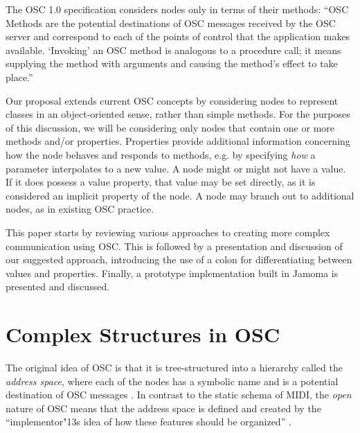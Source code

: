 \documentclass{NIME-alternate}
\begin{document}

The OSC 1.0 specification \cite{Wright:2002} considers nodes only in terms of their methods: ``OSC Methods are the potential destinations of OSC messages received by the OSC server and correspond to each of the points of control that the application makes available. `Invoking' an OSC method is analogous to a procedure call; it means supplying the method with arguments and causing the method's effect to take place.'' 

Our proposal extends current OSC concepts by considering nodes to represent classes in an object-oriented sense, rather than simple methods.  For the purposes of this discussion, we will be considering only nodes that contain one or more methods and/or properties.   Properties provide additional information concerning how the node behaves and responds to methods, e.g. by specifying \emph{how} a parameter interpolates to a new value. A node might or might not have a value. If it does possess a value property, that value may be set directly, as it is considered an implicit property of the node. A node may branch out to additional nodes, as in existing OSC practice.

This paper starts by reviewing various approaches to creating more complex communication using OSC. This is followed by a presentation and discussion of our suggested approach, introducing the use of a colon for differentiating between values and properties. Finally, a prototype implementation built in Jamoma is presented and discussed. 





\section{Complex Structures in OSC} %
\label{sec:complex_structures_in_OSC}


The original idea of OSC is that it is tree-structured into a hierarchy called the \emph{address space}, where each of the nodes has a symbolic name and is a potential destination of OSC messages \cite{Wright:1997}. In contrast to the static schema of MIDI, the \emph{open} nature of OSC means that the address space is defined and created by the ``implementor\char"13s idea of how these features should be organized'' \cite[p.~153]{Wright:2003}.
\end{document}
